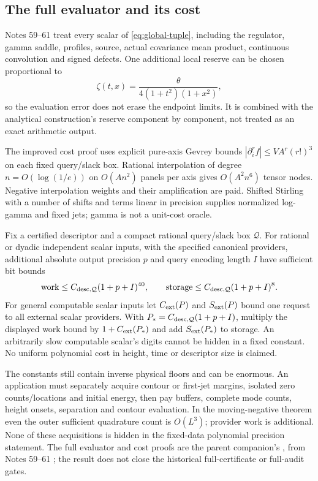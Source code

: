 \subsection{The full evaluator and its cost}
Notes 59--61 treat every scalar of \eqref{eq:global-tuple}, including
the regulator, gamma saddle, profiles, source, actual covariance mean
product, continuous convolution and signed defects. One additional
local reserve can be chosen proportional to
\[
 \zeta(t,x)=\frac{\theta}{4(1+t^2)(1+x^2)},
\]
so the evaluation error does not erase the endpoint limits. It is
combined with the analytical construction's reserve component by
component, not treated as an exact arithmetic output.

The improved cost proof uses explicit pure-axis Gevrey bounds
$|\partial_i^rf|\le V A^r(r!)^3$ on each fixed query/slack box.
Rational interpolation of degree $n=O(\log(1/e))$ on
$O(An^2)$ panels per axis gives $O(A^2n^6)$ tensor nodes. Negative
interpolation weights and their amplification are paid. Shifted
Stirling with a number of shifts and terms linear in precision supplies
normalized log-gamma and fixed jets; gamma is not a unit-cost oracle.

\begin{theorem}
\label{thm:cost}
Fix a certified descriptor and a compact rational query/slack box
$\mathcal Q$. For rational or dyadic independent scalar inputs, with
the specified canonical providers, additional absolute output precision
$p$ and query encoding length $I$ have sufficient bit bounds
\begin{equation}
 \operatorname{work}\le C_{\rm desc,\mathcal Q}(1+p+I)^{40},\qquad
 \operatorname{storage}\le C_{\rm desc,\mathcal Q}(1+p+I)^8.
 \label{eq:physical-complexity}
\end{equation}
For general computable scalar inputs let $C_{\rm ext}(P)$ and
$S_{\rm ext}(P)$ bound one request to all external scalar providers.
With $P_*=C_{\rm desc,\mathcal Q}(1+p+I)$, multiply the displayed work
bound by $1+C_{\rm ext}(P_*)$ and add $S_{\rm ext}(P_*)$ to storage.
An arbitrarily slow computable scalar's digits cannot be hidden in a
fixed constant. No uniform polynomial cost in height, time or descriptor
size is claimed.
\end{theorem}
The constants still contain inverse physical floors and can be
enormous. An application must separately acquire contour or first-jet margins, isolated zero counts/locations and initial energy, then pay buffers, complete mode counts, height onsets, separation and contour evaluation. In the moving-negative theorem even the outer sufficient quadrature count is $O(L^3)$; provider work is additional. None of these acquisitions is hidden in the fixed-data polynomial precision statement. The full evaluator and cost proofs are the parent companion's
,
from Notes 59--61 \cite{evaluation,phase,cost}; the result
does not close the historical full-certificate or full-audit gates.

